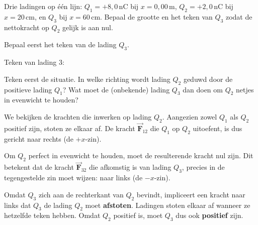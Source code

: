 \documentclass{ximera}
\begin{document}
\begin{exercise}
    Drie ladingen op één lijn: $Q_{1}= +8{,}0  \, \mathrm{nC}$ bij $x=0{,}00 \, \mathrm{m}$, $Q_{2}= +2{,}0  \, \mathrm{nC}$ bij $x=20 \, \mathrm{cm}$, en $Q_{3}$ bij $x=60 \, \mathrm{cm}$.  
    Bepaal de grootte en het teken van \(Q_{3}\) zodat de nettokracht op \(Q_{2}\) gelijk is aan nul.
    
    \begin{question}
        Bepaal eerst het teken van de lading \(Q_{3}\).
        
        Teken van lading 3: 
        
        \begin{hint}
            Teken eerst de situatie. In welke richting wordt lading $Q_2$ geduwd door de positieve lading $Q_1$? Wat moet de (onbekende) lading $Q_3$ dan doen om $Q_2$ netjes in evenwicht te houden?
        \end{hint}
        
        \begin{solution}\nl
            We bekijken de krachten die inwerken op lading \(Q_{2}\). Aangezien zowel $Q_1$ als $Q_2$ positief zijn, stoten ze elkaar af. De kracht $\vec{\mathbf{F}}_{12}$ die $Q_1$ op $Q_2$ uitoefent, is dus gericht naar rechts (de $+x$-zin).
            
            Om $Q_2$ perfect in evenwicht te houden, moet de resulterende kracht nul zijn. Dit betekent dat de kracht $\vec{\mathbf{F}}_{32}$ die afkomstig is van lading $Q_3$, precies in de tegengestelde zin moet wijzen: naar links (de $-x$-zin).
            
            Omdat $Q_3$ zich aan de rechterkant van $Q_2$ bevindt, impliceert een kracht naar links dat $Q_3$ de lading $Q_2$ moet \textbf{afstoten}. Ladingen stoten elkaar af wanneer ze hetzelfde teken hebben. Omdat $Q_2$ positief is, moet $Q_3$ dus ook \textbf{positief} zijn.

            \begin{center}
\end{center}
\end{solution}
\end{question}
\end{exercise}
\end{document}
